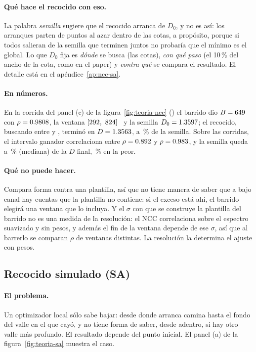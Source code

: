 \documentclass[11pt,a4paper]{article}
\begin{document}
\paragraph{Qué hace el recocido con eso.} La palabra \emph{semilla} sugiere
que el recocido arranca de $D_0$, y no es así: los \NArranques{} arranques
parten de puntos al azar dentro de las cotas, a propósito, porque si todos
salieran de la semilla que terminen juntos no probaría que el mínimo es el
global. Lo que $D_0$ fija es \emph{dónde} se busca (las cotas), \emph{con qué
paso} (el 10\,\% del ancho de la cota, como en el paper) y \emph{contra qué}
se compara el resultado. El detalle está en el apéndice~\ref{ap:ncc-sa}.

\paragraph{En números.} En la corrida del panel (c) de la
figura~\ref{fig:teoria-ncc} (\EjCorrida) el barrido dio $B = 649$~\mVns{} con
$\rho = 0.9808$, la ventana $[292,\ 824]$~\mVns{} y la semilla
$D_0 = 1.3597$; el recocido, buscando entre \EjCotaDMin{} y \EjCotaDMax,
terminó en $D = 1.3563$, a \EjDesvSemilla\,\% de la semilla. Sobre las
\NCorridas{} corridas, el intervalo ganador correlaciona entre $\rho = 0.892$
y $\rho = 0.983$, y la semilla queda a \SemillaMediana\,\% (mediana) de la
$D$ final, \SemillaMax\,\% en la peor.

\paragraph{Qué no puede hacer.} Compara forma contra una plantilla, así que no
tiene manera de saber que a bajo canal hay cuentas que la plantilla no
contiene: si el exceso está ahí, el barrido elegirá una ventana que lo
incluya. Y el $\sigma$ con que se construye la plantilla del barrido no es una
medida de la resolución: el NCC correlaciona sobre el espectro suavizado y sin
pesos, y además el fin de la ventana depende de ese $\sigma$, así que al
barrerlo se comparan $\rho$ de ventanas distintas. La resolución la determina
el ajuste con pesos.

\subsection{Recocido simulado (SA)}
\label{sec:sa}
\adaptado

\paragraph{El problema.} Un optimizador local sólo sabe bajar: desde donde
arranca camina hasta el fondo del valle en el que cayó, y no tiene forma de
saber, desde adentro, si hay otro valle más profundo. El resultado depende del
punto inicial. El panel (a) de la figura~\ref{fig:teoria-sa} muestra el caso.
\end{document}
